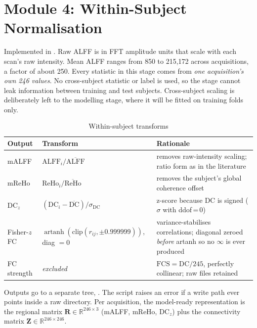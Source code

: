 \documentclass{ssnreview}
\newcommand{\hdr}{\rowcolor{SSNBlue!12}}                      %
\begin{document}
\section{Module 4: Within-Subject Normalisation}\label{sec:impl-norm}
Implemented in .
Raw ALFF is in FFT amplitude units that scale with each scan's raw intensity.
Mean ALFF ranges from 850 to 215,172 across acquisitions, a factor of about
250. Every statistic in this stage comes from \emph{one acquisition's own 246
values}. No cross-subject statistic or label is used, so the stage cannot leak
information between training and test subjects. Cross-subject scaling is
deliberately left to the modelling stage, where it will be fitted on training
folds only.

\begin{table}[H]
\centering
\caption{Within-subject transforms}\label{tab:norm}
\small
\begin{tabularx}{\textwidth}{llX}
\toprule
\hdr Output & Transform & Rationale\\
\midrule
mALFF & $\text{ALFF}_i / \overline{\text{ALFF}}$ & removes raw-intensity scaling; ratio form as in the literature\\
mReHo & $\text{ReHo}_i / \overline{\text{ReHo}}$ & removes the subject's global coherence offset\\
DC$_z$ & $(\text{DC}_i-\overline{\text{DC}})/\sigma_{\text{DC}}$ & z-score because DC is signed ($\sigma$ with ddof\,=\,0)\\
Fisher-$z$ FC & $\operatorname{artanh}(\text{clip}(r_{ij},\pm0.999999))$, diag $=0$ & variance-stabilises correlations; diagonal zeroed \emph{before} artanh so no $\infty$ is ever produced\\
FC strength & \emph{excluded} & $\text{FCS}=\text{DC}/245$, perfectly collinear; raw files retained\\
\bottomrule
\end{tabularx}
\end{table}

Outputs go to a separate tree, . The
script raises an error if a write path ever points inside a raw
 directory. Per acquisition, the model-ready representation
is the regional matrix $\mathbf{R}\in\mathbb{R}^{246\times3}$ (mALFF, mReHo,
DC$_z$) plus the connectivity matrix $\mathbf{Z}\in\mathbb{R}^{246\times246}$.

\end{document}
